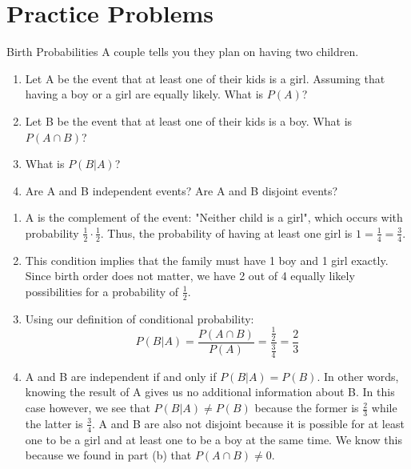 \documentclass[11pt]{article}
\begin{document}
\section*{Practice Problems}
\begin{exercise}{Birth Probabilities}
A couple tells you they plan on having two children.
\begin{enumerate}
    \item Let {A} be the event that at least one of their kids is a girl. Assuming that having a boy or a girl are equally likely. What is $P({A})$?
    \item Let {B} be the event that at least one of their kids is a boy. What is $P(A\cap B)$?
    \item What is $P(B|A)$?
    \item Are {A} and {B} independent events? Are {A} and {B} disjoint events?
\end{enumerate}
\end{exercise}
\begin{solution}{3}
\begin{enumerate}
    \item {A} is the complement of the event: "Neither child is a girl", which occurs with probability $\frac{1}{2}\cdot\frac{1}{2}$. Thus, the probability of having at least one girl is $1=\frac{1}{4}=\frac{3}{4}$.
    \item This condition implies that the family must have 1 boy and 1 girl exactly. Since birth order does not matter, we have 2 out of 4 equally likely possibilities for a probability of $\frac{1}{2}$.
    \item Using our definition of conditional probability: \[P(B|A) = \frac{P(A\cap B)}{P(A)} = \frac{\frac{1}{2}}{\frac{3}{4}} = \frac{2}{3}\]
    \item {A} and {B} are independent if and only if $P(B|A) = P(B)$. In other words, knowing the result of {A} gives us no additional information about {B}. In this case however, we see that $P(B|A) \neq P(B)$ because the former is $\frac{2}{3}$ while the latter is $\frac{3}{4}$. {A} and {B} are also not disjoint because it is possible for at least one to be a girl and at least one to be a boy at the same time. We know this because we found in part (b) that $P(A\cap B) \neq 0$.
\end{enumerate}
\end{solution}
\end{document}

